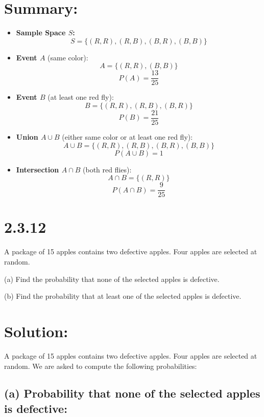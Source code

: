 \documentclass{article}
\begin{document}
\section*{Summary:}
\begin{itemize}
    \item \textbf{Sample Space \( S \):}
    \[
    S = \{ (R,R), (R,B), (B,R), (B,B) \}
    \]
    
    \item \textbf{Event \( A \)} (same color):
    \[
    A = \{ (R,R), (B,B) \}
    \]
    \[
    P(A) = \frac{13}{25}
    \]
    
    \item \textbf{Event \( B \)} (at least one red fly):
    \[
    B = \{ (R,R), (R,B), (B,R) \}
    \]
    \[
    P(B) = \frac{21}{25}
    \]

    \item \textbf{Union \( A \cup B \)} (either same color or at least one red fly):
    \[
    A \cup B = \{ (R,R), (R,B), (B,R), (B,B) \}
    \]
    \[
    P(A \cup B) = 1
    \]
        
    \item \textbf{Intersection \( A \cap B \)} (both red flies):
    \[
    A \cap B = \{ (R,R) \}
    \]
    \[
    P(A \cap B) = \frac{9}{25}
    \]
    

\end{itemize}

\section*{2.3.12}
A package of 15 apples contains two defective apples. Four apples are selected at random.

(a) Find the probability that none of the selected apples is defective.

(b) Find the probability that at least one of the selected apples is defective.

\section*{Solution:}

A package of 15 apples contains two defective apples. Four apples are selected at random. We are asked to compute the following probabilities:

\subsection*{(a) Probability that none of the selected apples is defective:}
\end{document}
